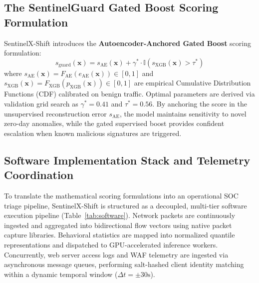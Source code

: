 \documentclass[conference,10pt,twocolumn]{IEEEtran}
\begin{document}
\subsection{The SentinelGuard Gated Boost Scoring Formulation}
SentinelX-Shift introduces the \textbf{Autoencoder-Anchored Gated Boost} scoring formulation:
\begin{equation}
s_{\text{guard}}(\mathbf{x}) = s_{\text{AE}}(\mathbf{x}) + \gamma^* \cdot \mathbb{I}\left(s_{\text{XGB}}(\mathbf{x}) > \tau^*\right)
\label{eq:guard_scoring}
\end{equation}
where $s_{\text{AE}}(\mathbf{x}) = F_{\text{AE}}(e_{\text{AE}}(\mathbf{x})) \in [0, 1]$ and $s_{\text{XGB}}(\mathbf{x}) = F_{\text{XGB}}(p_{\text{XGB}}(\mathbf{x})) \in [0, 1]$ are empirical Cumulative Distribution Functions (CDF) calibrated on benign traffic. Optimal parameters are derived via validation grid search as $\gamma^* = 0.41$ and $\tau^* = 0.56$. By anchoring the score in the unsupervised reconstruction error $s_{\text{AE}}$, the model maintains sensitivity to novel zero-day anomalies, while the gated supervised boost provides confident escalation when known malicious signatures are triggered.

\subsection{Software Implementation Stack and Telemetry Coordination}
To translate the mathematical scoring formulations into an operational SOC triage pipeline, SentinelX-Shift is structured as a decoupled, multi-tier software execution pipeline (Table~\ref{tab:software}). Network packets are continuously ingested and aggregated into bidirectional flow vectors using native packet capture libraries. Behavioral statistics are mapped into normalized quantile representations and dispatched to GPU-accelerated inference workers. Concurrently, web server access logs and WAF telemetry are ingested via asynchronous message queues, performing salt-hashed client identity matching within a dynamic temporal window ($\Delta t = \pm 30\text{s}$).
\end{document}
